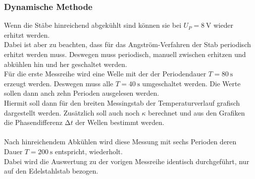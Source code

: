 \subsubsection{Dynamische Methode}
\noindent
Wenn die Stäbe hinreichend abgekühlt sind können sie bei $U_P=\SI{8}{\volt}$ wieder erhitzt werden.\\
Dabei ist aber zu beachten, dass für das Angström-Verfahren der Stab periodisch erhitzt werden muss.
Deswegen muss periodisch, manuell zwischen erhitzen und abkühlen hin und her geschaltet werden.\\
Für die erste Messreihe wird eine Welle mit der der Periodendauer $T=\SI{80}{\second}$ erzeugt werden.
Deswegen muss alle $T=\SI{40}{\second}$ umgeschaltet werden. Die Werte sollen dann anch zehn Perioden ausgelesen werden.\\
Hiermit soll dann für den breiten Messingstab der Temperaturverlauf grafisch dargestellt werden. Zusätzlich soll auch noch $\kappa$ berechnet und aus den Grafiken die Phasendifferenz $\increment t$ der Wellen bestimmt werden.\\\\

\noindent
Nach hinreichendem Abkühlen wird diese Messung mit sechs Perioden deren Dauer $T=\SI{200}{\second}$ entspricht, wiederholt.\\
Dabei wird die Auswertung zu der vorigen Messreihe identisch durchgeführt, nur auf den Edelstahlstab bezogen.
